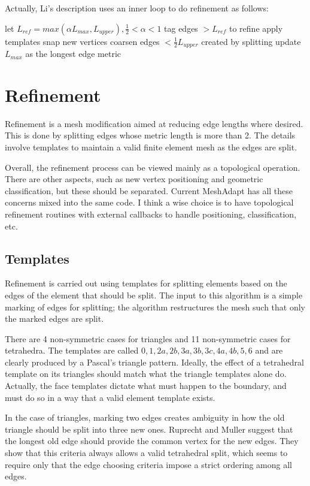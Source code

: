 \documentclass{article}
\begin{document}
Actually, Li's description uses an inner loop to
do refinement as follows:
\begin{algorithmic}
\State let $L_{ref}=max(\alpha L_{max},L_{upper}), \frac12 < \alpha < 1$
\State tag edges $>L_{ref}$ to refine
\State apply templates
\State snap new vertices
\State coarsen edges $<\frac12L_{upper}$ created by splitting
\State update $L_{max}$ as the longest edge metric
\EndWhile
\end{algorithmic}

\section{Refinement}

Refinement is a mesh modification aimed at reducing
edge lengths where desired.
This is done by splitting edges whose metric length
is more than 2.
The details involve templates to maintain a valid
finite element mesh as the edges are split.

Overall, the refinement process can be viewed mainly
as a topological operation.
There are other aspects, such as new vertex positioning
and geometric classification, but these should be
separated.
Current MeshAdapt has all these concerns mixed into
the same code.
I think a wise choice is to have topological refinement
routines with external callbacks to handle positioning,
classification, etc.

\subsection{Templates}

Refinement is carried out using templates for splitting
elements based on the edges of the element that should
be split.
The input to this algorithm is a simple marking of edges
for splitting; the algorithm restructures the mesh such
that only the marked edges are split.

There are 4 non-symmetric cases for triangles and 11 non-symmetric
cases for tetrahedra.
The templates are called $0,1,2a,2b,3a,3b,3c,4a,4b,5,6$ and are
clearly produced by a Pascal's triangle pattern.
Ideally, the effect of a tetrahedral template on its triangles should
match what the triangle templates alone do.
Actually, the face templates dictate what must happen to the boundary,
and must do so in a way that a valid element template exists.

In the case of triangles, marking two edges creates ambiguity in how
the old triangle should be split into three new ones.
Ruprecht and Muller suggest that the longest old edge should
provide the common vertex for the new edges.
They show that this criteria always allows a valid tetrahedral split,
which seems to require only that the edge choosing criteria impose
a strict ordering among all edges.
\end{document}
